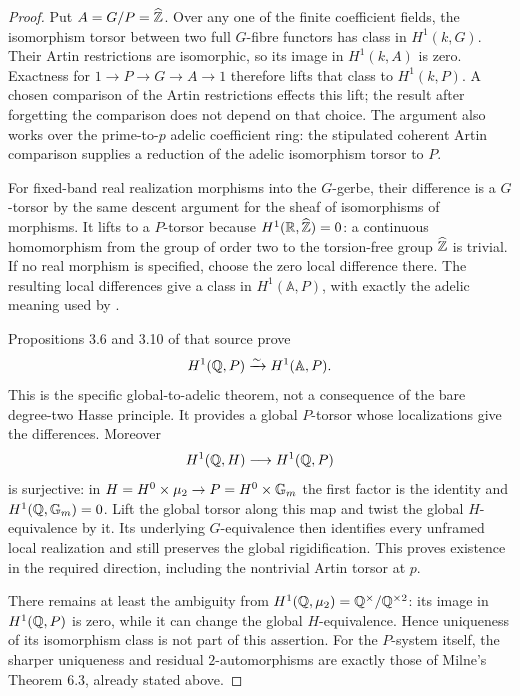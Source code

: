 \begin{proof}
Put $A=G/P=\widehat{\mathbb Z}$. Over any one of the finite coefficient
fields, the isomorphism torsor between two full $G$-fibre functors
has class in $H^1(k,G)$. Their Artin restrictions are isomorphic,
so its image in $H^1(k,A)$ is zero. Exactness for
$1\to P\to G\to A\to1$ therefore lifts that class to
$H^1(k,P)$. A chosen comparison of the Artin restrictions effects
this lift; the result after forgetting the comparison does not
depend on that choice. The argument also works over the
prime-to-$p$ adelic coefficient ring: the stipulated coherent
Artin comparison supplies a reduction of the adelic isomorphism
torsor to $P$.

For fixed-band real realization morphisms into the $G$-gerbe,
their difference is a $G$-torsor by the same descent argument for
the sheaf of isomorphisms of morphisms. It lifts to a $P$-torsor
because $H^1(\mathbb R,\widehat{\mathbb Z})=0$: a continuous homomorphism
from the group of order two to the torsion-free group
$\widehat{\mathbb Z}$ is trivial. If no real morphism is specified, choose
the zero local difference there. The resulting local differences
give a class in $H^1(\mathbb A,P)$, with exactly the adelic
meaning used by \citet[\S6.2]{AMilne2003}.

Propositions 3.6 and 3.10 of that source prove
\[
 H^1(\mathbb Q,P)\xrightarrow{\sim}H^1(\mathbb A,P).
\]
This is the specific global-to-adelic theorem, not a consequence
of the bare degree-two Hasse principle. It provides a global
$P$-torsor whose localizations give the differences. Moreover
\[
 H^1(\mathbb Q,H)\longrightarrow H^1(\mathbb Q,P)
\]
is surjective: in $H=H^0\times\mu_2\to P=H^0\times{\mathbb G_m}$
the first factor is the identity and $H^1(\mathbb Q,{\mathbb G_m})=0$.
Lift the global torsor along this map and twist the global
$H$-equivalence by it. Its underlying $G$-equivalence then
identifies every unframed local realization and still preserves
the global rigidification. This proves existence in the required
direction, including the nontrivial Artin torsor at $p$.

There remains at least the ambiguity from
$H^1(\mathbb Q,\mu_2)=\mathbb Q^\times/\mathbb Q^{\times2}$: its image in
$H^1(\mathbb Q,P)$ is zero, while it can change the global
$H$-equivalence. Hence uniqueness of its isomorphism class is not
part of this assertion. For the $P$-system itself, the sharper
uniqueness and residual $2$-automorphisms are exactly those of
Milne's Theorem 6.3, already stated above.
\end{proof}

